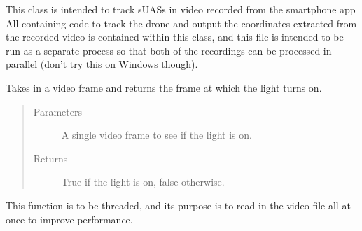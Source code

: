 \documentclass[letterpaper,10pt,english]{sphinxmanual}
\begin{document}
\begin{fulllineitems}
\label{\detokenize{index:src.Controllers.OpenCVThreadedController.DroneTracker}}
This class is intended to track sUASs in video recorded from the smartphone app
All containing code to track the drone and output the coordinates extracted from
the recorded video is contained within this class, and this file is intended
to be run as a separate process so that both of the recordings can be processed
in parallel (don’t try this on Windows though).

\begin{fulllineitems}
\label{\detokenize{index:src.Controllers.OpenCVThreadedController.DroneTracker.is_light_on}}
Takes in a video frame and returns the frame at which the light turns on.
\begin{quote}\begin{description}
\item[{Parameters}] \leavevmode
{} \textendash{} A single video frame to see if the light is on.

\item[{Returns}] \leavevmode
True if the light is on, false otherwise.

\end{description}\end{quote}

\end{fulllineitems}


\begin{fulllineitems}
\label{\detokenize{index:src.Controllers.OpenCVThreadedController.DroneTracker.read_video}}
This function is to be threaded, and its purpose is to read in the video file
all at once to improve performance.


\end{fulllineitems}
\end{fulllineitems}
\end{document}

